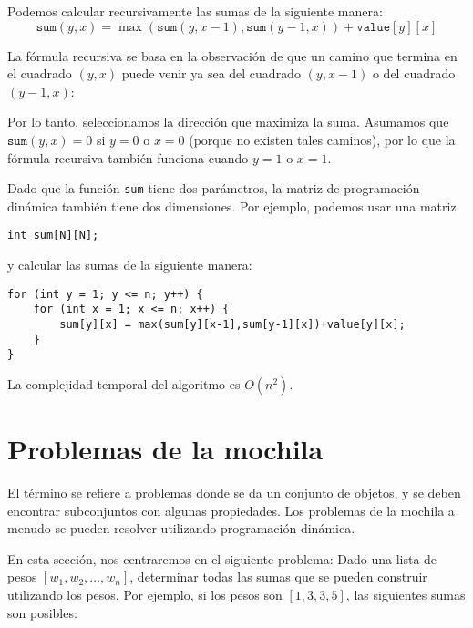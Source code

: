Podemos calcular recursivamente las sumas
de la siguiente manera:
\[ \texttt{sum}(y,x) = \max(\texttt{sum}(y,x-1),\texttt{sum}(y-1,x))+\texttt{value}[y][x]\]


La fórmula recursiva se basa en la observación
de que un camino que termina en el cuadrado $(y,x)$
puede venir ya sea del cuadrado $(y,x-1)$
o del cuadrado $(y-1,x)$:
\begin{center}
\end{center}

Por lo tanto, seleccionamos la dirección que maximiza
la suma.
Asumamos que $\texttt{sum}(y,x)=0$
si $y=0$ o $x=0$ (porque no existen tales caminos),
por lo que la fórmula recursiva también funciona cuando $y=1$ o $x=1$.

Dado que la función \texttt{sum} tiene dos parámetros,
la matriz de programación dinámica también tiene dos dimensiones.
Por ejemplo, podemos usar una matriz
\begin{lstlisting}
int sum[N][N];
\end{lstlisting}
y calcular las sumas de la siguiente manera:
\begin{lstlisting}
for (int y = 1; y <= n; y++) {
    for (int x = 1; x <= n; x++) {
        sum[y][x] = max(sum[y][x-1],sum[y-1][x])+value[y][x];
    }
}
\end{lstlisting}
La complejidad temporal del algoritmo es $O(n^2)$.

\section{Problemas de la mochila}


El término  se refiere a problemas donde
se da un conjunto de objetos, y 
se deben encontrar subconjuntos con algunas propiedades.
Los problemas de la mochila a menudo se pueden resolver
utilizando programación dinámica.

En esta sección, nos centraremos en el siguiente
problema: Dado una lista de pesos
$[w_1,w_2,\ldots,w_n]$,
determinar todas
las sumas que se pueden construir utilizando los pesos.
Por ejemplo, si los pesos son
$[1,3,3,5]$, las siguientes sumas son posibles:

